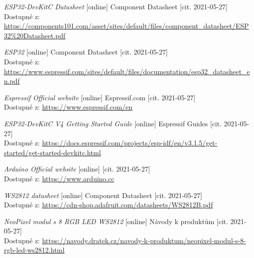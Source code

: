  \newpage

 \label{liter}
 \begin{thebibliography}{99}





\textit{ESP32-DevKitC Datasheet} [online] Component Datasheet [cit. 2021-05-27] \\
Dostupné z: \url{https://components101.com/asset/sites/default/files/component_datasheet/ESP32%20Datasheet.pdf}

\textit{ESP32} [online] Component Datasheet [cit. 2021-05-27] \\
Dostupné z: \url{https://www.espressif.com/sites/default/files/documentation/esp32_datasheet_en.pdf} 

\textit{Espressif Official website} [online] Espressif.com [cit. 2021-05-27] \\
Dostupné z: \url{https://www.espressif.com/en}

\textit{ESP32-DevKitC V4 Getting Started Guide} [online] Espressif Guides [cit. 2021-05-27] \\
Dostupné z: \url{https://docs.espressif.com/projects/esp-idf/en/v3.1.5/get-started/get-started-devkitc.html}

\textit{Arduino Official website} [online] [cit. 2021-05-27] \\
Dostupné z: \url{https://www.arduino.cc}

\textit{WS2812 datasheet} [online] Component Datasheet [cit. 2021-05-27] \\
Dostupné z: \url{https://cdn-shop.adafruit.com/datasheets/WS2812B.pdf}

\textit{NeoPixel modul s 8 RGB LED WS2812} [online] Návody k produktům [cit. 2021-05-27] \\
Dostupné z: \url{https://navody.dratek.cz/navody-k-produktum/neopixel-modul-s-8-rgb-led-ws2812.html}



\end{thebibliography}
